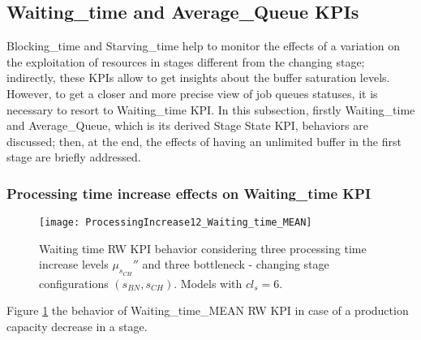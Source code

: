 \subsection{Waiting\_time and Average\_Queue KPIs}
\label{Waiting time and Average Queue KPIs - Processing time variation}
Blocking\_time and Starving\_time help to monitor the effects of a variation on the exploitation of resources in stages different from the changing stage; indirectly, these KPIs allow to get insights about the buffer saturation levels. However, to get a closer and more precise view of job queues statuses, it is necessary to resort to Waiting\_time KPI. In this subsection, firstly Waiting\_time and Average\_Queue, which is its derived Stage State KPI, behaviors are discussed; then, at the end, the effects of having an unlimited buffer in the first stage are briefly addressed.
\subsubsection{Processing time increase effects on Waiting\_time KPI}
\begin{figure}[h] 
\centering
\texttt{[image: ProcessingIncrease12\_Waiting\_time\_MEAN]}
\caption[Waiting time RW KPI behavior with different processing time increase levels]{Waiting time RW KPI behavior considering three processing time increase levels $\mu_{s_{CH}}''$ and three bottleneck - changing stage configurations $(s_{BN},s_{CH})$. Models with $cl_s=6$.}
\label{fig:Waiting time KPI behavior with different processing time increase levels}
\end{figure}
Figure \ref{fig:Waiting time KPI behavior with different processing time increase levels} the behavior of Waiting\_time\_MEAN RW KPI in case of a production capacity decrease in a stage. 
